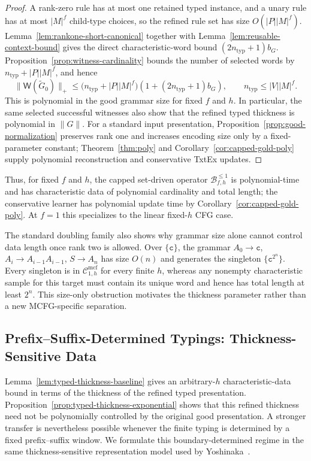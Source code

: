 \documentclass[11pt]{article}
\numberwithin{equation}{section}
\theoremstyle{plain}
\theoremstyle{definition}
\theoremstyle{remark}
\newcommand{\Wit}{\mathsf{W}}
\newcommand{\Cmcf}[2]{\mathcal{C}^{\mathrm{mcf}}_{#1,#2}}
\begin{document}
\begin{proof}
A rank-zero rule has at most one retained typed instance, and a unary rule has
at most $|M|^f$ child-type choices, so the refined rule set has size
$O(|P||M|^f)$.  Lemma~\ref{lem:rankone-short-canonical} together with
Lemma~\ref{lem:reusable-context-bound} gives the direct characteristic-word
bound $(2n_{\mathrm{typ}}+1)b_G$.  Proposition~\ref{prop:witness-cardinality} bounds the number of
selected words by $n_{\mathrm{typ}}+|P||M|^f$, and hence
\[
 \|\Wit(\widetilde G_0)\|_+
 \le \bigl(n_{\mathrm{typ}}+|P||M|^f\bigr)(1+(2n_{\mathrm{typ}}+1)b_G),
 \qquad n_{\mathrm{typ}}\le |V||M|^f.
\]
This is polynomial in the good grammar size for fixed $f$ and $h$.  In particular, the same
selected successful witnesses also show that the refined typed thickness is
polynomial in $\|G\|$.  For a standard input presentation,
Proposition~\ref{prop:good-normalization} preserves rank one and increases
encoding size only by a fixed-parameter constant; Theorem~\ref{thm:poly} and
Corollary~\ref{cor:capped-gold-poly} supply polynomial reconstruction and
conservative TxtEx updates.
\end{proof}

Thus, for fixed $f$ and $h$, the capped set-driven
operator $\mathcal B_{f,h}^{\le1}$ is polynomial-time and has characteristic
data of polynomial cardinality and total length; the conservative learner has
polynomial update time by Corollary~\ref{cor:capped-gold-poly}.  At $f=1$ this specializes to the linear fixed-$h$ CFG case.

The standard doubling family also shows why grammar size alone cannot control
data length once rank two is allowed.  Over $\{\mathtt c\}$, the grammar
$A_0\to\mathtt c$, $A_i\to A_{i-1}A_{i-1}$, $S\to A_n$ has size $O(n)$ and
generates the singleton $\{\mathtt c^{2^n}\}$.  Every singleton is in
$\Cmcf{1}{h}$ for every finite $h$, whereas any nonempty characteristic sample
for this target must contain its unique word and hence has total length at
least $2^n$.  This size-only obstruction motivates the thickness parameter rather than a
new MCFG-specific separation.

\subsection{Prefix--Suffix-Determined Typings: Thickness-Sensitive Data}
\label{subsec:boundary-polydata}

Lemma~\ref{lem:typed-thickness-baseline} gives an arbitrary-$h$
characteristic-data bound in terms of the thickness of the refined typed
presentation.  Proposition~\ref{prop:typed-thickness-exponential} shows that
this refined thickness need not be polynomially controlled by the original
good presentation.  A stronger transfer is nevertheless possible whenever the
finite typing is determined by a fixed prefix--suffix window.  We formulate
this boundary-determined regime in the same thickness-sensitive representation
model used by Yoshinaka~\cite[Section~4.3]{Yoshinaka2011}.
\end{document}
